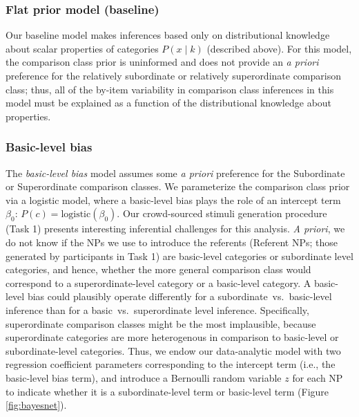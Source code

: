\documentclass[doc]{apa6}
\begin{document}

\subsubsection{Flat prior model (baseline)}

Our baseline model makes inferences based only on distributional knowledge about scalar properties of categories $P(x \mid k)$ (described above).
For this model, the comparison class prior is uninformed and does not provide an \emph{a priori} preference for the relatively subordinate or relatively superordinate comparison class; thus, all of the by-item variability in comparison class inferences in this model must be explained as a function of the distributional knowledge about properties.

\subsubsection{Basic-level bias}

The \emph{basic-level bias} model assumes some \emph{a priori} preference for the Subordinate or Superordinate comparison classes.
We parameterize the comparison class prior via a logistic model, where a basic-level bias plays the role of an intercept term $\beta_0$: $P(c) = \text{logistic}(\beta_0)$.
Our crowd-sourced stimuli generation procedure (Task 1) presents interesting inferential challenges for this analysis. 
\emph{A priori}, we do not know if the NPs we use to introduce the referents (Referent NPs; those generated by participants in Task 1) are basic-level categories or subordinate level categories, and hence, whether the more general comparison class would correspond to a superordinate-level category or a basic-level category.
A basic-level bias could plausibly operate differently for a subordinate~vs.~basic-level inference than for a basic~vs.~superordinate level inference. 
Specifically, superordinate comparison classes might be the most implausible, because superordinate categories are more heterogenous in comparison to basic-level or subordinate-level categories.
Thus, we endow our data-analytic model with two regression coefficient parameters corresponding to the intercept term (i.e., the basic-level bias term), and introduce a Bernoulli random variable $z$ for each NP to indicate whether it is a subordinate-level term or basic-level term (Figure \ref{fig:bayesnet}).
\end{document}
